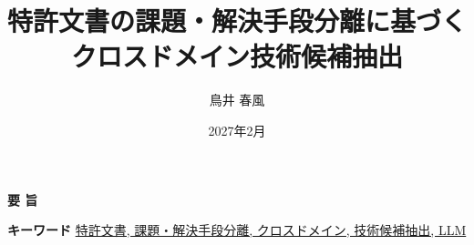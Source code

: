 \documentclass{my_bthesis}
\title{特許文書の課題・解決手段分離に基づく\\クロスドメイン技術候補抽出}
\author{鳥井 春風}
\date{2027年2月}
\begin{document}
\maketitle

\startabstractpage
{}

\begin{center}
  {\Large \textbf{要 \quad 旨}}
\end{center}



\vspace*{1mm}
\begin{center}
\noindent \textbf{キーワード} \underline{特許文書, 課題・解決手段分離, クロスドメイン, 技術候補抽出, LLM}
\end{center}

\newpage

\tableofcontents
\clearpage

\listoffigures
\clearpage

\listoftables
\clearpage

\startmaintext
{}












\appendix



\end{document}
